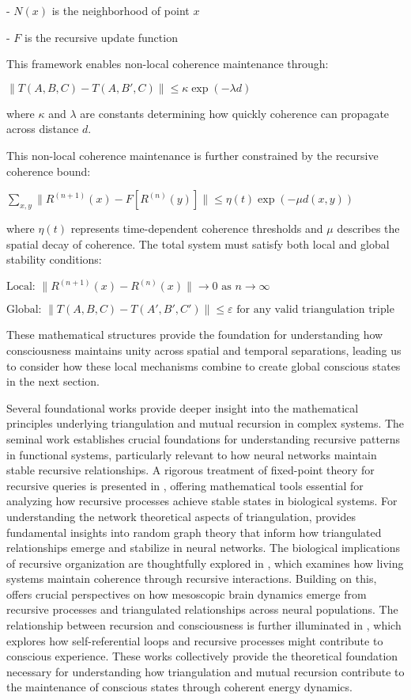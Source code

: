 - $N(x)$ is the neighborhood of point $x$

- $F$ is the recursive update function

This framework enables non-local coherence maintenance through:

$\|T(A,B,C) - T(A,B',C)\| \leq \kappa \exp(-\lambda d)$

where $\kappa$ and $\lambda$ are constants determining how quickly coherence can propagate across distance $d$.

This non-local coherence maintenance is further constrained by the recursive coherence bound:

$\sum_{x,y} \|R^{(n+1)}(x) - F[R^{(n)}(y)]\| \leq \eta(t)\exp(-\mu d(x,y))$

where $\eta(t)$ represents time-dependent coherence thresholds and $\mu$ describes the spatial decay of coherence. The total system must satisfy both local and global stability conditions:

$\text{Local: } \|R^{(n+1)}(x) - R^{(n)}(x)\| \rightarrow 0 \text{ as } n \rightarrow \infty$

$\text{Global: } \|T(A,B,C) - T(A',B',C')\| \leq \varepsilon \text{ for any valid triangulation triple}$

These mathematical structures provide the foundation for understanding how consciousness maintains unity across spatial and temporal separations, leading us to consider how these local mechanisms combine to create global conscious states in the next section.

Several foundational works provide deeper insight into the mathematical principles underlying triangulation and mutual recursion in complex systems. The seminal work \cite{Bird1988} establishes crucial foundations for understanding recursive patterns in functional systems, particularly relevant to how neural networks maintain stable recursive relationships. A rigorous treatment of fixed-point theory for recursive queries is presented in \cite{Alegre2017}, offering mathematical tools essential for analyzing how recursive processes achieve stable states in biological systems. For understanding the network theoretical aspects of triangulation, \cite{Erdos1959} provides fundamental insights into random graph theory that inform how triangulated relationships emerge and stabilize in neural networks. The biological implications of recursive organization are thoughtfully explored in \cite{Maturana1987}, which examines how living systems maintain coherence through recursive interactions. Building on this, \cite{Freeman2000} offers crucial perspectives on how mesoscopic brain dynamics emerge from recursive processes and triangulated relationships across neural populations. The relationship between recursion and consciousness is further illuminated in \cite{Hofstadter2007}, which explores how self-referential loops and recursive processes might contribute to conscious experience. These works collectively provide the theoretical foundation necessary for understanding how triangulation and mutual recursion contribute to the maintenance of conscious states through coherent energy dynamics.